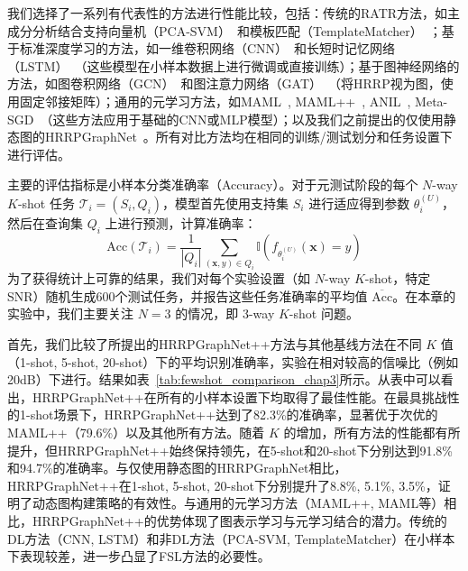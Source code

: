 我们选择了一系列有代表性的方法进行性能比较，包括：传统的RATR方法，如主成分分析结合支持向量机（PCA-SVM）~\cite{Liu2020}和模板匹配（TemplateMatcher）~\cite{Cui2022}；基于标准深度学习的方法，如一维卷积网络（CNN）~\cite{Song2019}和长短时记忆网络（LSTM）~\cite{liu2021multi}（这些模型在小样本数据上进行微调或直接训练）；基于图神经网络的方法，如图卷积网络（GCN）~\cite{kipf2017semi}和图注意力网络（GAT）~\cite{velickovic2018graph}（将HRRP视为图，使用固定邻接矩阵）；通用的元学习方法，如MAML~\cite{Finn2017}, MAML++~\cite{Antoniou2018}, ANIL~\cite{raghu2020rapid}, Meta-SGD~\cite{li2017meta}（这些方法应用于基础的CNN或MLP模型）；以及我们之前提出的仅使用静态图的HRRPGraphNet~\cite{Chen2024}。所有对比方法均在相同的训练/测试划分和任务设置下进行评估。

主要的评估指标是小样本分类准确率（Accuracy）。对于元测试阶段的每个 $N$-way $K$-shot 任务 $\mathcal{T}_i = (S_i, Q_i)$，模型首先使用支持集 $S_i$ 进行适应得到参数 $\theta_i^{(U)}$，然后在查询集 $Q_i$ 上进行预测，计算准确率：
\begin{equation}
    \text{Acc}(\mathcal{T}_i) = \frac{1}{|Q_i|} \sum_{(\mathbf{x},y) \in Q_i} \mathbb{I}(f_{\theta_i^{(U)}}(\mathbf{x}) = y)
    \label{eq:accuracy_metric}
\end{equation}
为了获得统计上可靠的结果，我们对每个实验设置（如 $N$-way $K$-shot，特定SNR）随机生成600个测试任务，并报告这些任务准确率的平均值 $\overline{\text{Acc}}$。在本章的实验中，我们主要关注 $N=3$ 的情况，即 3-way $K$-shot 问题。

首先，我们比较了所提出的HRRPGraphNet++方法与其他基线方法在不同 $K$ 值（1-shot, 5-shot, 20-shot）下的平均识别准确率，实验在相对较高的信噪比（例如20dB）下进行。结果如表~\ref{tab:fewshot_comparison_chap3}所示。从表中可以看出，HRRPGraphNet++在所有的小样本设置下均取得了最佳性能。在最具挑战性的1-shot场景下，HRRPGraphNet++达到了82.3\%的准确率，显著优于次优的MAML++（79.6\%）以及其他所有方法。随着 $K$ 的增加，所有方法的性能都有所提升，但HRRPGraphNet++始终保持领先，在5-shot和20-shot下分别达到91.8\%和94.7\%的准确率。与仅使用静态图的HRRPGraphNet相比，HRRPGraphNet++在1-shot, 5-shot, 20-shot下分别提升了8.8\%, 5.1\%, 3.5\%，证明了动态图构建策略的有效性。与通用的元学习方法（MAML++, MAML等）相比，HRRPGraphNet++的优势体现了图表示学习与元学习结合的潜力。传统的DL方法（CNN, LSTM）和非DL方法（PCA-SVM, TemplateMatcher）在小样本下表现较差，进一步凸显了FSL方法的必要性。

